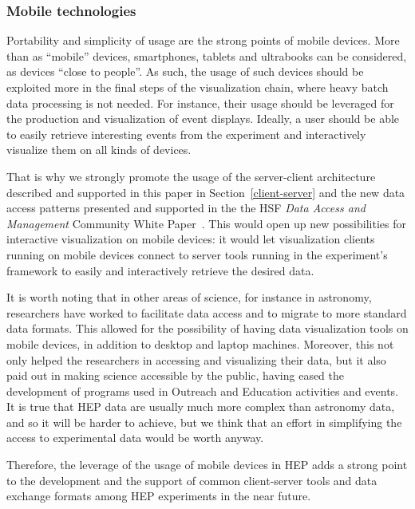 \documentclass[12pt,a4paper]{article}
\begin{document}
\hypertarget{mobile-tech}{%
\subsubsection{Mobile technologies}\label{mobile-tech}}

Portability and simplicity of usage are the strong points of mobile devices. More than as ``mobile'' devices, smartphones,
tablets and ultrabooks can be considered, as devices ``close to people''. As such, the usage of such devices
should be exploited more in the final steps of the visualization chain, where heavy batch data processing is not needed. For instance,
their usage should be leveraged for the production and visualization of event displays.
Ideally, a user should be able to easily retrieve interesting events from the experiment and interactively visualize them on all
kinds of devices.

That is why we strongly promote the usage of the server-client architecture described and supported in this paper in Section~\ref{client-server}
and the new data access patterns presented and supported in the the HSF \textit{Data Access and Management} Community White Paper~\cite{HSF-CWP-2017-04}. %
This would open up new possibilities for interactive visualization on mobile devices: it would let visualization clients running on mobile devices
connect to server tools running in the experiment's framework to easily and interactively retrieve the desired data.

It is worth noting that in other areas of science, for instance in astronomy, researchers have worked to facilitate data
access and to migrate to more standard data formats. This allowed for the possibility of having data visualization tools
on mobile devices, in addition to desktop and laptop machines. Moreover, this not only helped the researchers in accessing and visualizing
their data, but it also paid out in making science accessible by the public, having eased the development of programs used in
Outreach and Education activities and events. It is true that HEP data are usually much more complex than astronomy data, and so it
will be harder to achieve, but we think that an effort in simplifying the access to experimental data would be worth anyway.

Therefore, the leverage of the usage of mobile devices in HEP adds a strong point to the development and the support of common
client-server tools and data exchange formats among HEP experiments in the near future.
\end{document}
